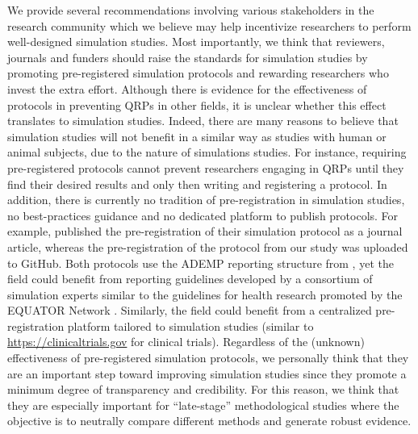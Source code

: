 \documentclass[a4paper, 11pt]{article}
\begin{document}
We provide several recommendations involving various stakeholders in the
research community which we believe may help incentivize researchers to perform
well-designed simulation studies. Most importantly, we think that reviewers,
journals and funders should raise the standards for simulation studies by
promoting pre-registered simulation protocols and rewarding researchers who
invest the extra effort. Although there is evidence for the effectiveness of
protocols in preventing QRPs in other fields, it is unclear whether this effect
translates to simulation studies. Indeed, there are many reasons to believe that
simulation studies will not benefit in a similar way as studies with human or
animal subjects, due to the nature of simulations studies. For instance,
requiring pre-registered protocols cannot prevent researchers engaging in QRPs
until they find their desired results and only then writing and registering a
protocol. In addition, there is currently no tradition of pre-registration in
simulation studies, no best-practices guidance and no dedicated platform to
publish protocols. For example, \citet{Kipruto2022} published the
pre-registration of their simulation protocol as a journal article, whereas the
pre-registration of the protocol from our study was uploaded to GitHub. Both
protocols use the ADEMP reporting structure from \citet{Morris2019}, yet the
field could benefit from reporting guidelines developed by a consortium of
simulation experts similar to the guidelines for health research promoted by the
EQUATOR Network \citep{Altman2008}. Similarly, the field could benefit from a
centralized pre-registration platform tailored to simulation studies (similar to
\url{https://clinicaltrials.gov} for clinical trials). Regardless of the
(unknown) effectiveness of pre-registered simulation protocols, we personally
think that they are an important step toward improving simulation studies since
they promote a minimum degree of transparency and credibility. For this reason,
we think that they are especially important for ``late-stage'' methodological
studies \citep{Heinze2022} where the objective is to neutrally compare different
methods and generate robust evidence.
\end{document}
